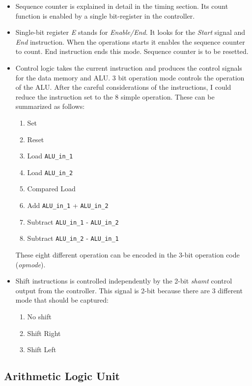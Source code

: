 \documentclass[12pt]{article}
\begin{document}
\begin{itemize}
\item Sequence counter is explained in detail in the timing section. Its count function is enabled by a single bit-register in the controller.

\item Single-bit register \textsl{E} stands for \textsl{Enable/End}. It looks for the \textsl{Start} signal and \textsl{End} instruction. When the operations starts it enables the sequence counter to count. End instruction ends this mode. Sequence counter is to be resetted.

\item Control logic takes the current instruction and produces the control signals for the data memory and ALU. 3 bit operation mode controls the operation of the ALU. After the careful considerations of the instructions, I could reduce the instruction set to the 8 simple operation. These can be summarized as follows:
\begin{enumerate}
\item Set
\item Reset 
\item Load \verb|ALU_in_1|
\item Load \verb|ALU_in_2|
\item Compared Load
\item Add \verb|ALU_in_1| + \verb|ALU_in_2|
\item Subtract \verb|ALU_in_1| - \verb|ALU_in_2|
\item Subtract \verb|ALU_in_2| - \verb|ALU_in_1|
\end{enumerate}
These eight different operation can be encoded in the 3-bit operation code (\textsl{opmode}).

\item Shift instructions is controlled independently by the 2-bit \textsl{shamt} control output from the controller. This signal is 2-bit because there are 3 different mode that should be captured:

\begin{enumerate}
\item No shift
\item Shift Right
\item Shift Left
\end{enumerate} 
\end{itemize}





\subsection*{Arithmetic Logic Unit}
\end{document}
